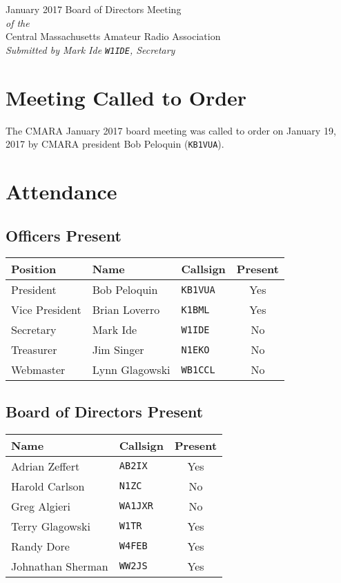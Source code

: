 \documentclass[10pt,letterpaper]{article}
\begin{document}
\begin{center}
{\huge January 2017 Board of Directors Meeting}\\
\emph{of the}\\
{\Large Central Massachusetts Amateur Radio Association}\\
\emph{Submitted by Mark Ide \texttt{W1IDE}, Secretary}
\end{center}

\section{Meeting Called to Order}
The CMARA January 2017 board meeting was called to order on January 19, 2017 by CMARA president Bob Peloquin (\texttt{KB1VUA}).

\section{Attendance}

\subsection{Officers Present}
\begin{tabular}{|l|l|l|c|}
  \hline
  \textbf{Position} & \textbf{Name}  & \textbf{Callsign} & \textbf{Present} \\ \hline
  President         & Bob Peloquin   & \texttt{KB1VUA}   & Yes \\
  Vice President    & Brian Loverro  & \texttt{K1BML}    & Yes \\
  Secretary         & Mark Ide       & \texttt{W1IDE}    & No \\
  Treasurer         & Jim Singer     & \texttt{N1EKO}    & No \\
  Webmaster         & Lynn Glagowski & \texttt{WB1CCL}   & No \\
  \hline
\end{tabular}

\subsection{Board of Directors Present}
\begin{tabular}{|l|l|c|}
  \hline
  \textbf{Name}     & \textbf{Callsign} & \textbf{Present} \\ \hline
  Adrian Zeffert    & \texttt{AB2IX}    & Yes \\
  Harold Carlson    & \texttt{N1ZC}     & No  \\
  Greg Algieri      & \texttt{WA1JXR}   & No  \\
  Terry Glagowski   & \texttt{W1TR}     & Yes \\
  Randy Dore        & \texttt{W4FEB}    & Yes \\
  Johnathan Sherman & \texttt{WW2JS}    & Yes \\
  \hline
\end{tabular}
\end{document}
